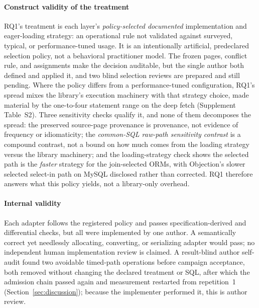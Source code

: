 \paragraph{Construct validity of the treatment}
RQ1's treatment is each layer's \emph{policy-selected documented} implementation and eager-loading
strategy: an operational rule not validated against surveyed, typical, or performance-tuned usage.
It is an intentionally artificial, predeclared selection policy, not a behavioral practitioner model.
The frozen pages, conflict rule, and assignments make the decision auditable, but the single author
both defined and applied it, and two blind selection reviews are prepared and still pending.
Where the policy differs from a performance-tuned configuration, RQ1's spread mixes the library's
execution machinery with that strategy choice, made material by the one-to-four statement range on
the deep fetch (Supplement Table~S2).
Three sensitivity checks qualify it, and none of them decomposes the spread: the preserved
source-page provenance is provenance, not evidence of frequency or idiomaticity; the
\emph{common-SQL raw-path sensitivity contrast} is a compound contrast, not a bound on how much
comes from the loading strategy versus the library machinery; and the loading-strategy check shows
the selected path is the \emph{faster} strategy for the join-selected ORMs, with Objection's slower
selected select-in path on MySQL disclosed rather than corrected.
RQ1 therefore answers what this policy yields, not a library-only overhead.

\paragraph{Internal validity}
Each adapter follows the registered policy and passes specification-derived and differential checks,
but all were implemented by one author.
A semantically correct yet needlessly allocating, converting, or serializing adapter would pass; no
independent human implementation review is claimed.
A result-blind author self-audit found two avoidable timed-path operations before campaign
acceptance, both removed without changing the declared treatment or SQL, after which the admission
chain passed again and measurement restarted from repetition~1
(Section~\ref{sec:discussion}); because the implementer performed it, this is author review.

